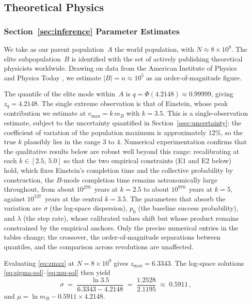 \documentclass{article}
\begin{document}
\subsection{Theoretical Physics}\label{ssec:physics}

\subsubsection{Section~\ref{sec:inference} Parameter Estimates}

We take as our parent population~$A$ the world population, with
$N \approx 8 \times 10^9$. The elite subpopulation~$B$ is identified with
the set of actively publishing theoretical physicists worldwide. Drawing
on data from the American Institute of Physics \cite{aip2024trends} and
Physics Today \cite{physicstodaymillion}, we estimate $|B| = n \approx
10^5$ as an order-of-magnitude figure.

The quantile of the elite mode within~$A$ is
$q = \Phi(4.2148) \approx 0.99999$, giving $z_q = 4.2148$.
The single extreme observation is that of Einstein, whose peak
contribution we estimate at $v_{\max} = k\,m_B$ with $k = 3.5$.
This is a single-observation estimate, subject to the uncertainty
quantified in Section~\ref{ssec:uncertainty}: the coefficient of
variation of the population maximum is approximately $12\%$, so the true
$k$ plausibly lies in the range $3$ to $4$. Numerical experimentation
confirms that the qualitative results below are robust well beyond this
range: recalibrating at each $k \in [2.5,\, 5.0]$ so that the two empirical constraints (E1 and E2 below) hold, which fixes Einstein's completion time and the collective probability by construction, the $B$-mode completion time remains astronomically large throughout, from about $10^{270}$~years at $k = 2.5$ to about $10^{970}$~years at $k = 5$, against $10^{537}$~years at the central $k = 3.5$. The parameters that absorb the variation are $\sigma$ (the
log-space dispersion), $p_0$ (the baseline success probability), and
$\lambda$ (the step rate), whose calibrated values shift but whose
product remains constrained by the empirical anchors. Only the precise
numerical entries in the tables change; the crossover, the
order-of-magnitude separations between quantiles, and the comparison
across revolutions are unaffected.

Evaluating \eqref{eq:zmax} at $N = 8 \times 10^9$ gives
$z_{\max} = 6.3343$. The log-space solutions
\eqref{eq:sigma-sol}--\eqref{eq:mu-sol} then yield
\begin{equation}\label{eq:physics-sigma}
  \sigma
  \;=\;
  \frac{\ln 3.5}{6.3343 - 4.2148}
  \;=\;
  \frac{1.2528}{2.1195}
  \;\approx\; 0.5911\,,
\end{equation}
and $\mu = \ln m_B - 0.5911 \times 4.2148$.
\end{document}
